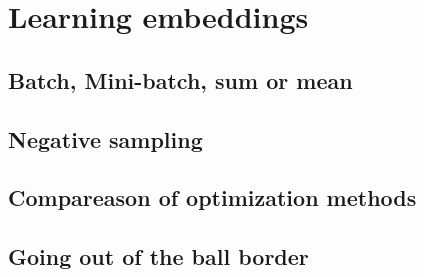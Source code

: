 \documentclass{article}
\begin{document}
    \section{Learning embeddings}
            \subsection{Batch, Mini-batch, sum or mean}

            \subsection{Negative sampling}

            \subsection{Compareason of optimization methods}

            \subsection{Going out of the ball border}
            
\end{document}
